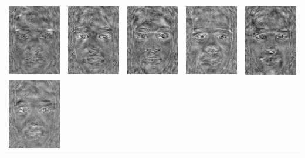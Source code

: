 \documentclass[12pt]{article}
\begin{document}
\begin{enumerate}
\begin{enumerate}
\begin{table}[H]
\end{table}
\begin{table}[H]
\centering
\begin{tabular}{ccccc}
\includegraphics[width=1in]{lda/0}&\includegraphics[width=1in]{lda/1}&
\includegraphics[width=1in]{lda/2}&\includegraphics[width=1in]{lda/3}&
\includegraphics[width=1in]{lda/4}\\\includegraphics[width=1in]{lda/5}&

\end{tabular}
\end{table}
\end{enumerate}
\end{enumerate}
\end{document}
